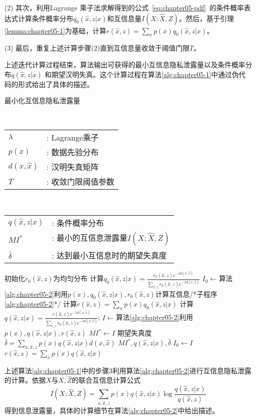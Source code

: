 (2) 其次，利用Lagrange 乘子法求解得到的公式~\ref{eq:chapter05-pdf}~的条件概率表达式计算条件概率分布$q_0(\hat{x},z|x)$和互信息量$I(X;\hat{X},Z)$。然后，基于引理\ref{lemma:chapter05-1}为基础，计算$r(\hat{x},z)=\sum_{x}p(x)q_0(\hat{x},z|x)$。

(3) 最后，重复上述计算步骤(2)直到互信息量收敛于阈值门限$T$。

上述迭代计算过程结束，算法输出可获得的最小互信息隐私泄露量以及条件概率分布$q(\hat{x},z|x)$ 和期望汉明失真。这个计算过程在算法\ref{alg:chapter05-1}中通过伪代码的形式给出了具体的描述。
\begin{algorithm}[htbp]
 \small
\caption{ 最小化互信息隐私泄露量}
\label{alg:chapter05-1}
\begin{algorithmic}[1]
\REQUIRE ~~\\
\begin{tabular}[t]{p{8mm}l}
 $\lambda$&:  Lagrange乘子\\
 $p(x)$&: 数据先验分布\\
 $d(x,\hat{x})$&: 汉明失真矩阵\\
 $T$&: 收敛门限阈值参数
\end{tabular}
\ENSURE ~~\\
\begin{tabular}[t]{p{8mm}l}
$q(\hat{x},z|x)$&: 条件概率分布\\
$MI^*$&: 最小的互信息泄露量$I(X;\hat{X},Z)$\\
$\bar{\delta}$&: 达到最小互信息时的期望失真度
\end{tabular}
\STATE 初始化$r_0(\hat{x},z)$为均匀分布
\STATE 计算$q_0(\hat{x},z|x)=\frac{r_0(\hat{x},z)e^{-\lambda d(x,\hat{x})}}{\sum_{\hat{x},z}r_0(\hat{x},z)e^{-\lambda d(x,\hat{x})}}$
\STATE $I_0\leftarrow $算法\ref{alg:chapter05-2}利用$p(x),q_0(\hat{x},z|x),r_0(\hat{x},z)$计算互信息/*子程序\ref{alg:chapter05-2}*/
\STATE 计算$r(\hat{x},z)=\sum_{x}p(x)q_0(\hat{x},z|x)$
\STATE 计算$q(\hat{x},z|x)=\frac{r(\hat{x},z)e^{-\lambda d(x,\hat{x})}}{\sum_{\hat{x},z}r_0(\hat{x},z)e^{-\lambda d(x,\hat{x})}}$;
\STATE $I \leftarrow $算法\ref{alg:chapter05-2}利用$p(x),q(\hat{x},z|x),r(\hat{x},z)$
\STATE $MI^* \leftarrow I$
\STATE 期望失真度$\bar{\delta}=\sum_{x,\hat{x},z}p(x)q(\hat{x},z|x)d(x,\hat{x})$
\RETURN $MI^*, q(\hat{x},z|x), \bar{\delta}$
\ELSE
\STATE $I_0 \leftarrow I$
\STATE $r(\hat{x},z)=\sum_{x}p(x)q(\hat{x},z|x)$
\ENDIF
\ENDWHILE
\end{algorithmic}
\end{algorithm}

上述算法\ref{alg:chapter05-1}中的步骤$3$利用算法\ref{alg:chapter05-2}进行互信息隐私泄露的计算。依据$X$与$X,\hat{Z}$的联合互信息计算公式
\begin{equation}
	I(X;\hat{X},Z)=\sum_{x,\hat{x},z}p(x)q(\hat{x},z|x) \log \frac{q(\hat{x},z|x)}{q(\hat{x},z)}
\end{equation}
得到信息泄露量，具体的计算细节在算法\ref{alg:chapter05-2}中给出描述。

